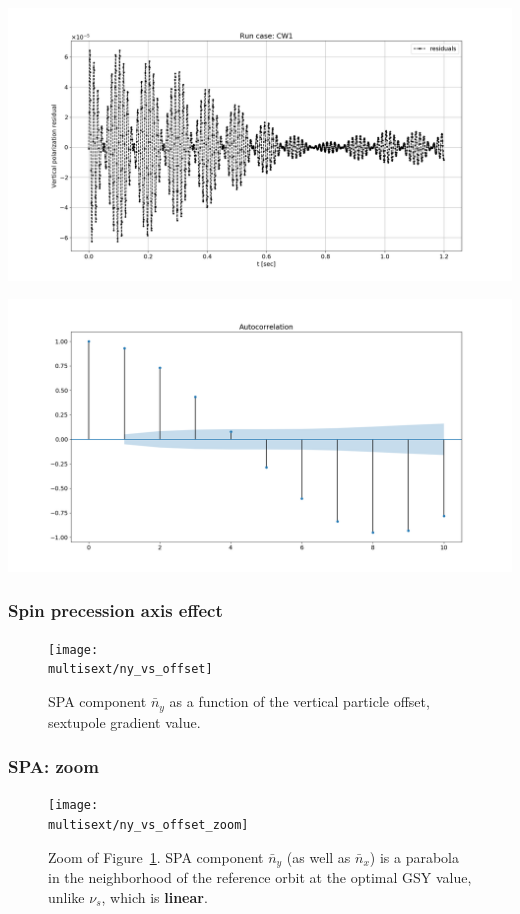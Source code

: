 \documentclass{beamer}
\newcommand{\home}{\string~}
\newcommand{\Artem}{\home/REPOS/COSYINF/img/Artem}
\newcommand{\multisext}{\Artem/multisext_test}
\begin{document}
\begin{frame}
  \centering
  \includegraphics[height=.5\paperheight, trim=0 25 0 25, clip]{../img/SEMINAR/RESID_VS_TIME}
  
  \includegraphics[height=.5\paperheight, trim=0 25 0 25, clip]{../img/SEMINAR/RESID_AUTOCORR}
\end{frame}

\begin{frame}\frametitle{Spin precession axis effect}
  \begin{figure}[H]
    \centering
    \texttt{[image: \\multisext/ny\_vs\_offset]}
    \caption{SPA component $\bar n_y$ as a function of the vertical particle offset, sextupole gradient value.\label{fig:DECOH_full_ny}}
  \end{figure}
\end{frame}

\begin{frame}\frametitle{SPA: zoom}
  \begin{figure}[H]
    \texttt{[image: \\multisext/ny\_vs\_offset\_zoom]}
    \caption{Zoom of Figure~\ref{fig:DECOH_full_ny}. SPA component $\bar
      n_y$ (as well as $\bar n_x$) is a parabola in the neighborhood of the reference orbit at
      the optimal GSY value, unlike $\nu_s$, which is \textbf{linear}.}
  \end{figure}
\end{frame}
\end{document}
